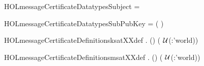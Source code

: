 \newcommand{\HOLmessageCertificateDatatypesRootRoleCertificate}{\UseVerbatim{HOLmessageCertificateDatatypesRootRoleCertificate}}
\begin{SaveVerbatim}{HOLmessageCertificateDatatypesSubject}
 =  
\end{SaveVerbatim}
\newcommand{\HOLmessageCertificateDatatypesSubject}{\UseVerbatim{HOLmessageCertificateDatatypesSubject}}
\begin{SaveVerbatim}{HOLmessageCertificateDatatypesSubPubKey}
 =  ( )
\end{SaveVerbatim}
\newcommand{\HOLmessageCertificateDatatypesSubPubKey}{\UseVerbatim{HOLmessageCertificateDatatypesSubPubKey}}
\newcommand{\HOLmessageCertificateDatatypes}{
\HOLmessageCertificateDatatypesAuthority\HOLmessageCertificateDatatypesDelegate\HOLmessageCertificateDatatypesDestination\HOLmessageCertificateDatatypesIssuer\HOLmessageCertificateDatatypesKCertSignature\HOLmessageCertificateDatatypesKeyCertificate\HOLmessageCertificateDatatypesMessage\HOLmessageCertificateDatatypesOrders\HOLmessageCertificateDatatypesOrigin\HOLmessageCertificateDatatypesRCertSignature\HOLmessageCertificateDatatypesRole\HOLmessageCertificateDatatypesRoleCertificate\HOLmessageCertificateDatatypesRootKeyCertificate\HOLmessageCertificateDatatypesRootRoleCertificate\HOLmessageCertificateDatatypesSubject\HOLmessageCertificateDatatypesSubPubKey}
\begin{SaveVerbatim}{HOLmessageCertificateDefinitionsksatXXdef}
\HOLTokenTurnstile{} \HOLSymConst{\HOLTokenForall{}}   .
     (\HOLSymConst{,}\HOLSymConst{,})   \HOLSymConst{\HOLTokenEquiv{}} (     \HOLSymConst{=} \ensuremath{\cal{U}}(:'world))
\end{SaveVerbatim}
\newcommand{\HOLmessageCertificateDefinitionsksatXXdef}{\UseVerbatim{HOLmessageCertificateDefinitionsksatXXdef}}
\begin{SaveVerbatim}{HOLmessageCertificateDefinitionsmsatXXdef}
\HOLTokenTurnstile{} \HOLSymConst{\HOLTokenForall{}}   .
     (\HOLSymConst{,}\HOLSymConst{,})   \HOLSymConst{\HOLTokenEquiv{}} (     \HOLSymConst{=} \ensuremath{\cal{U}}(:'world))
\end{SaveVerbatim}
